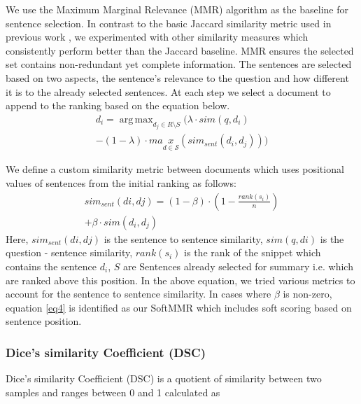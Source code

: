 \documentclass[11pt,a4paper]{article}
\DeclareMathOperator*{\argmax}{arg\,max}
\begin{document}
We use the Maximum Marginal Relevance (MMR) algorithm \cite{MMR} as the baseline for sentence selection. In contrast to the basic Jaccard similarity metric used in previous work \cite{khyati-paper}, we experimented with other similarity measures which consistently perform better than the Jaccard baseline. MMR ensures the selected set contains non-redundant yet complete information. The sentences are selected based on two aspects, the sentence's relevance to the question and how different it is to the already selected sentences. At each step we select a document to append to the ranking based on the equation below.
\vspace{-0.3cm}
\begin{multline}
     d_i = \argmax_{d_j\in R \setminus S} (\lambda \cdot sim(q, d_i)  \\  - (1 - \lambda) \cdot max\limits_{d \in \mathcal{S}}(sim_{sent}(d_i, d_j) ) ) \label{eq4}
\end{multline}
   

 We define a custom similarity metric between documents which uses positional values of sentences from the initial ranking as follows:
 \vspace{-0.3cm}
\begin{multline}
  sim_{sent}(di, dj) = ( 1 - \beta) \cdot (1 - \frac{rank(s_i)}{n}) \\+ \beta \cdot sim(d_i, d_j) 
\end{multline}
Here, $sim_{sent}(di, dj)$ is the sentence to sentence similarity, $sim(q, di)$  is the question - sentence similarity, $rank(s_i)$ is the rank of the snippet which contains the sentence $d_i$, $S$ are Sentences already selected for summary i.e. which are ranked above this position. In the above equation, we tried various metrics to account for the sentence to sentence similarity. In cases where $\beta$ is non-zero, equation \ref{eq4} is identified as our SoftMMR which includes soft scoring based on sentence position.

\subsubsection{Dice's similarity Coefficient (DSC)}

Dice's similarity Coefficient (DSC) \cite{dice} is a quotient of similarity between two samples and ranges between 0 and 1 calculated as
\end{document}
